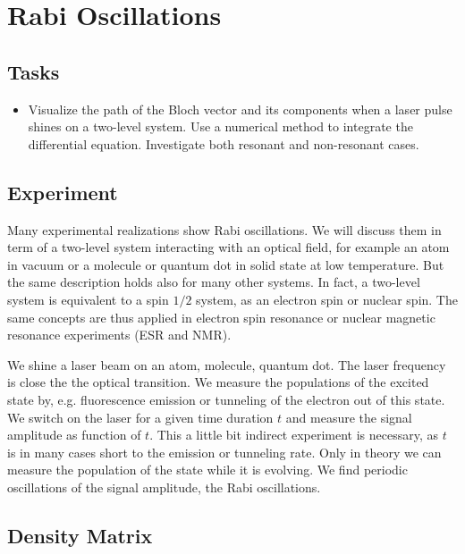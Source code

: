 \renewcommand{\lastmod}{April 7, 2020}


\chapter{Rabi Oscillations}



\section{Tasks}

\begin{itemize}
\item  Visualize the  path of the Bloch vector and its components when a laser pulse shines on a two-level system. Use a numerical method to integrate the differential equation. Investigate both resonant and non-resonant cases.
\end{itemize}



\section{Experiment}

Many experimental realizations show Rabi oscillations. We will discuss them in term of a two-level system interacting with an optical field, for example an atom in vacuum or a molecule or quantum dot in solid state at low temperature. But the same description holds also for many other systems. In fact, a two-level system is equivalent to a spin $1/2$ system, as an electron spin or nuclear spin. The same concepts are thus applied in electron spin resonance or nuclear magnetic resonance experiments (ESR and NMR).

We shine a laser beam on an atom, molecule, quantum dot. The laser frequency is close the the optical transition. We measure the populations of the excited state by, e.g. fluorescence emission or tunneling of the electron out of this state. We switch on the laser for a given time duration $t$ and measure the signal amplitude as function of $t$. This a little bit indirect experiment is necessary, as $t$ is in many cases short to the emission or tunneling rate. Only in theory we can measure the population of the state while it is evolving. We find periodic oscillations of the signal amplitude, the Rabi oscillations.

\section{Density Matrix}



